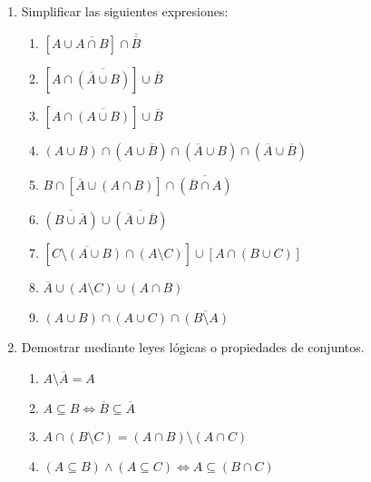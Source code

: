 \documentclass[a4paper]{article}
\newcommand{\exercise}{\item}
\newcommand{\Eq}{\Leftrightarrow}
\newcommand{\intersec}{\cap}
\newcommand{\union}{\cup}
\newcommand{\compl}[1]{\overline{#1}}
\begin{document}
\begin{enumerate}
\begin{enumerate} [label=(\alph*)]
		\item {}
		\item {}
		\item {}
	\end{enumerate}
	\exercise Simplificar las siguientes expresiones:
	\begin{multicols}{2}
	\begin{enumerate} [label=(\alph*)]
		\item $[A \union \compl{A \intersec B}] \intersec \compl{\compl{B}}$
		\item $[A \intersec \compl{(\compl{A} \union B)}] \union \compl{B}$
		\item $[A \intersec \compl{(A \union B)}] \union \compl{B}$ 
		\item $(A \union B) \intersec (A \union \compl{B}) \intersec (\compl{A} \union B) \intersec (\compl{A} \union \compl{B})$
		\item $B \intersec [\compl{A} \union (A \intersec B)] \intersec \compl{(\compl{B} \intersec A)}$
		\item $\compl{(B \union \compl{A})} \union \compl{(\compl{A} \union \compl{B})}$
		\item $[\compl{C \setminus (A \union B)} \intersec (A \setminus C)] \union [A \intersec (B \union C)]$
		\item $\compl{A} \union (A \setminus C) \union (A \intersec B)$
		\item $(A \union B) \intersec (A \union C) \intersec \compl{(B \setminus A)}$
	\end{enumerate}
	\end{multicols}
	\exercise Demostrar mediante leyes lógicas o propiedades de conjuntos.
	\begin{multicols}{2}
	\begin{enumerate} [label=(\alph*)]
		\item $A \setminus \compl{A} = A$
		\item $A \subseteq B \Eq \compl{B} \subseteq \compl{A}$
		\item $A \intersec (B\setminus C) = (A \intersec B) \setminus (A \intersec C)$
		\item $(A \subseteq B) \land (A \subseteq C) \Eq A \subseteq (B \intersec C)$

\end{enumerate}
\end{multicols}
\end{enumerate}
\end{document}
